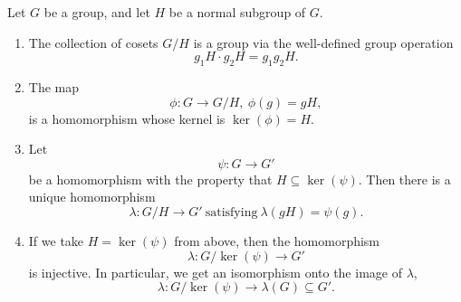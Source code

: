 \documentclass[math1530-lecture-notes]{subfiles}
\begin{document}
\begin{theorem}{}
  Let $G$ be a group, and let $H$ be a normal subgroup of $G$.
  \begin{enumerate}
    \item The collection of cosets $G / H$ is a group via the well-defined group operation \[
        g_1H\cdot g_2H=g_1g_2H
      .\] 
    \item The map \[
        \phi: G\longrightarrow G / H,\ \phi(g)=gH
      ,\] is a homomorphism whose kernel is $\ker{(\phi)}=H$.
    \item Let \[
      \psi:G\longrightarrow G'
      \] be a homomorphism with the property that $H\subseteq \ker{(\psi)}$. Then there is a unique
      homomorphism \[
        \lambda: G / H \longrightarrow G'~\text{satisfying}~\lambda(gH)=\psi(g)
      .\] 
    \item If we take $H=\ker{(\psi)}$ from above, then the homomorphism \[
        \lambda:G / \ker{(\psi)}\longrightarrow G'
      \] is injective. In particular, we get an isomorphism onto the image of $\lambda$, \[
        \lambda: G / \ker{(\psi)} \longrightarrow \lambda(G)\subseteq G'
      .\] 
  \end{enumerate}
\end{theorem}
\end{document}
